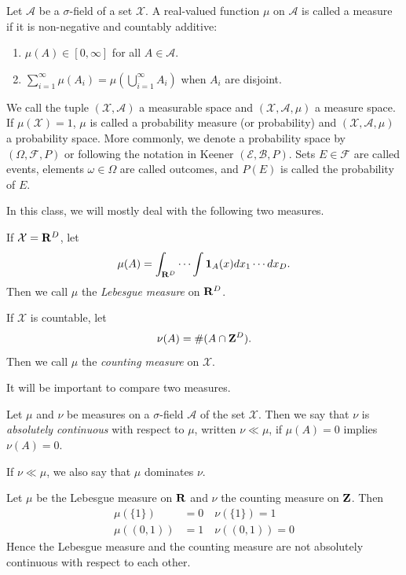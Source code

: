 \documentclass[twoside]{article}
\begin{document}
\begin{definition}\label{def:measure}\citep[Def. 1.4, p.~2]{keener}
  Let $\mathcal A$ be a $\sigma$-field of a set $\mathcal X$.  A real-valued function
  $\mu$ on $\mathcal A$ is called a measure if it is non-negative and countably additive:
  \begin{enumerate}
    \item  $\mu(A) \in [0, \infty]$ for all $A \in \mathcal A$.
    \item $\sum_{i=1}^\infty \mu(A_i) = \mu\left(\bigcup_{i=1}^\infty
      A_i\right)$ when $A_i$ are disjoint.
  \end{enumerate}
  We call the tuple $(\mathcal X, \mathcal A)$ a measurable space and
  $(\mathcal X, \mathcal A, \mu)$ a measure space.  If $\mu(\mathcal X) = 1$,
  $\mu$ is called a probability measure (or probability) and $(\mathcal X, \mathcal A, \mu)$
  a probability space.  More commonly, we denote a probability space by
  $(\Omega, \mathcal F, P)$ or following the notation in Keener $(\mathcal E, \mathcal B, P)$.
  Sets $E \in \mathcal F$ are called events, elements $\omega \in \Omega$
  are called outcomes, and $P(E)$ is called the probability of $E$.
\end{definition}

In this class, we will mostly deal with the following two measures.
\begin{example} 
 If $\mathcal X = \mathbf{R}^D$, let
    \[ \mu(A) = \int_{\mathbf{R}^D} \cdots \int \mathbf{1}_A(x) dx_1 \cdots dx_D. \]
  Then we call $\mu$ the \emph{Lebesgue measure} on $\mathbf{R}^D$.
\end{example}
\begin{example} 
  If $\mathcal X$ is countable, let
    \[ \nu(A) = \#(A \cap \mathbf{Z}^D). \]
  Then we call $\mu$ the \emph{counting measure} on $\mathcal X$.
\end{example}

It will be important to compare two measures.

\begin{definition}\label{def:absolutecontinuity}\citep[Def. 1.9, p.~7]{keener}
  Let $\mu$ and $\nu$ be measures on a $\sigma$-field $\mathcal A$ of the
  set $\mathcal X$. Then we say that $\nu$ is \emph{absolutely continuous} with
  respect to $\mu$, written $\nu \ll \mu$, if
  $\mu(A) = 0$ implies $\nu(A) = 0$.
\end{definition}
If $\nu \ll \mu$, we also say that $\mu$ dominates $\nu$.

\begin{example}  Let $\mu$ be the Lebesgue measure on $\mathbf{R}$ and $\nu$ the counting
  measure on $\mathbf{Z}$.  Then
  \begin{align*}
    \mu(\{1\}) &= 0 \quad \nu(\{1\}) = 1 \\
    \mu((0, 1)) &= 1 \quad \nu((0, 1)) = 0
  \end{align*}
  Hence the Lebesgue measure and the counting measure are not absolutely continuous
  with respect to each other.
\end{example}
\end{document}
